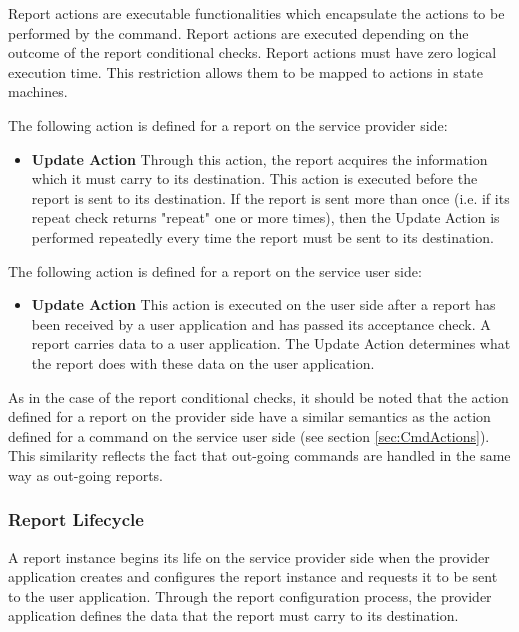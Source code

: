 Report actions are executable functionalities which encapsulate the actions to be performed by the command. Report actions are executed depending on the outcome of the report conditional checks. Report actions must have zero logical execution time. This restriction allows them to be mapped to actions in state machines. 

The following action is defined for a report on the service provider side:

\begin{itemize}
\item \textbf{Update Action}
Through this action, the report acquires the information which it must carry to its destination. This action is executed before the report is sent to its destination. If the report is sent more than once (i.e. if its repeat check returns "repeat" one or more times), then the Update Action is performed repeatedly every time the report must be sent to its destination.
\end{itemize} 

The following action is defined for a report on the service user side:

\begin{itemize}
\item \textbf{Update Action}
This action is executed on the user side after a report has been received by a user application and has passed its acceptance check. A report carries data to a user application. The Update Action determines what the report does with these data on the user application. 
\end{itemize} 

As in the case of the report conditional checks, it should be noted that the action defined for a report on the provider side have a similar semantics as the action defined for a command on the service user side (see section \ref{sec:CmdActions}). This similarity reflects the fact that out-going commands are handled in the same way as out-going reports.

\subsubsection{Report Lifecycle}\label{sec:RepLifecycle}

A report instance begins its life on the service provider side when the provider application creates and configures the report instance and requests it to be sent to the user application. Through the report configuration process, the provider application defines the data that the report must carry to its destination.

